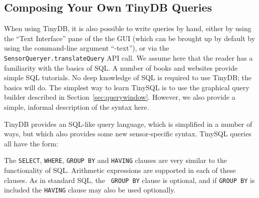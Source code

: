 \documentclass[11pt]{article}
\begin{document}
\subsection{Composing Your Own TinyDB Queries}
\label{sec:tinydbsqlsyntax}
When using TinyDB, it is also possible to write queries by
hand, either by using the ``Text Interface'' pane of the the GUI
(which can be brought up by default by using the command-line  argument ``-text''), 
or via the {\tt SensorQueryer.translateQuery} API call.  We assume here that
the reader has a familiarity with the basics of SQL.  A number of
books and websites provide simple SQL tutorials.  No deep knowledge of
SQL is required to use TinyDB; the basics will do.  The simplest way
to learn TinySQL is to use the graphical query
builder described in Section~\ref{sec:querywindow}.  However, we also
provide a simple, informal description of the syntax here.

TinyDB provides an SQL-like query language, which is simplified in a
number of ways, but which also provides some new sensor-specific syntax.
TinySQL queries all have the form:

 
The {\tt SELECT}, {\tt WHERE}, {\tt GROUP
  BY} and {\tt HAVING} clauses
are very similar to the functionality of SQL.
Arithmetic expressions are
supported in each of these clauses.  As in standard SQL, the {\tt
GROUP BY} clause is optional, and if {\tt GROUP BY} is
included the {\tt HAVING} clause may also be used optionally.
\end{document}
